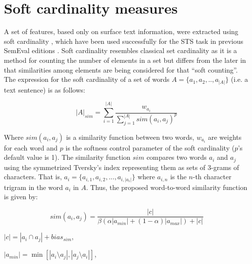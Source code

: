 
\section{Soft cardinality measures}
\label{sec:softcard}

A set of features, based only on surface text information,
were extracted using soft cardinality \cite{chavez_text_2010}, which
have been used successfully for the STS task in previous SemEval editions
\cite{jimenez_soft_2012,jimenez_softcardinality-core:_2013}. Soft
cardinality resembles classical set cardinality as it is a method
for counting the number of elements in a set but differs from the
later in that similarities among elements are being considered for
that ``soft counting''. The expression for the soft cardinality of a set of words $A=\{a_{1},a_{2},..,a_{|A|}\}$
(i.e. a text sentence) is as follows:

\begin{equation}
|A|_{sim}=\sum_{i=1}^{|A|}\frac{w_{a_{i}}}{\sum_{j=1}^{|A|}sim(a_{i},a_{j})^{p}}\label{eq:soft_card}
\end{equation}


Where $sim(a_{i},a_{j})$ is a similarity function between two words,
$w_{a_{i}}$ are weights for each word and $p$ is the softness control
parameter of the soft cardinality ($p$'s default value is 1). The
similarity function $sim$ compares two words $a_{i}$ and $a_{j}$
using the symmetrized Tversky's index \cite{tversky_features_1977,jimenez_softcardinality-core:_2013}
representing them as sets of 3-grams of characters. That is, $a_{i}=\{a_{i,1},a_{i,2},...,a_{i,|a_{i}|}\}$
where $a_{i,n}$ is the $n$-th character trigram in the word $a_{i}$
in $A$. Thus, the proposed word-to-word similarity function is given
by:

\begin{center}
\begin{equation}
sim(a_{i},a_{j})=\frac{|c|}{\beta(\alpha|a_{min}|+(1-\alpha)|a_{max}|)+|c|}\label{eq:symm_tversky}
\end{equation}

\par\end{center}

\begin{center}
$|c|=|a_{i}\cap a_{j}|+bias_{sim}$,
\par\end{center}

\begin{center}
$|a_{min}|=\min[|a_{i}\setminus a_{j}|,|a_{j}\setminus a_{i}|]$,
\par\end{center}

